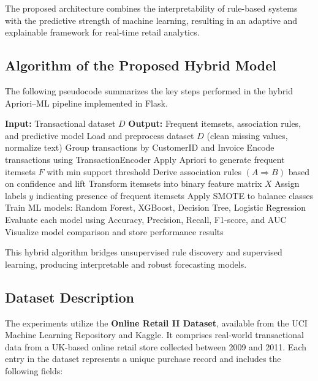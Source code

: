 \documentclass[twocolumn]{article}
\begin{document}
The proposed architecture combines the interpretability of rule-based systems with the predictive strength of machine learning, resulting in an adaptive and explainable framework for real-time retail analytics.

\subsection{Algorithm of the Proposed Hybrid Model}

The following pseudocode summarizes the key steps performed in the hybrid Apriori–ML pipeline implemented in Flask.

\begin{algorithm}[h!]
\caption{Hybrid Apriori + ML Recommendation and Forecasting}
\begin{algorithmic}[1]
\State \textbf{Input:} Transactional dataset $D$
\State \textbf{Output:} Frequent itemsets, association rules, and predictive model
\State Load and preprocess dataset $D$ (clean missing values, normalize text)
\State Group transactions by CustomerID and Invoice
\State Encode transactions using TransactionEncoder
\State Apply Apriori to generate frequent itemsets $F$ with min support threshold
\State Derive association rules $(A \Rightarrow B)$ based on confidence and lift
\State Transform itemsets into binary feature matrix $X$
\State Assign labels $y$ indicating presence of frequent itemsets
\State Apply SMOTE to balance classes
\State Train ML models: Random Forest, XGBoost, Decision Tree, Logistic Regression
\State Evaluate each model using Accuracy, Precision, Recall, F1-score, and AUC
\State Visualize model comparison and store performance results
\end{algorithmic}
\end{algorithm}

This hybrid algorithm bridges unsupervised rule discovery and supervised learning, producing interpretable and robust forecasting models.

\subsection{Dataset Description}

The experiments utilize the \textbf{Online Retail II Dataset}, available from the UCI Machine Learning Repository and Kaggle. It comprises real-world transactional data from a UK-based online retail store collected between 2009 and 2011. Each entry in the dataset represents a unique purchase record and includes the following fields:
\end{document}
